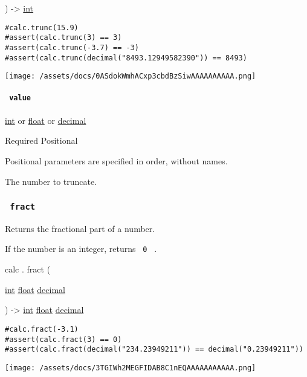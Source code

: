 ) -\textgreater{} \href{/docs/reference/foundations/int/}{int}

\begin{verbatim}
#calc.trunc(15.9)
#assert(calc.trunc(3) == 3)
#assert(calc.trunc(-3.7) == -3)
#assert(calc.trunc(decimal("8493.12949582390")) == 8493)
\end{verbatim}

\texttt{[image: /assets/docs/0ASdokWmhACxp3cbdBzSiwAAAAAAAAAA.png]}

\paragraph{\texorpdfstring{\texttt{\ value\ }}{ value }}\label{functions-trunc-value}

\href{/docs/reference/foundations/int/}{int} {or}
\href{/docs/reference/foundations/float/}{float} {or}
\href{/docs/reference/foundations/decimal/}{decimal}

{Required} {{ Positional }}

\label{functions-trunc-value-positional-tooltip}
Positional parameters are specified in order, without names.

The number to truncate.

\subsubsection{\texorpdfstring{\texttt{\ fract\ }}{ fract }}\label{functions-fract}

Returns the fractional part of a number.

If the number is an integer, returns \texttt{\ 0\ } .

calc { . } { fract } (

{ \href{/docs/reference/foundations/int/}{int}
\href{/docs/reference/foundations/float/}{float}
\href{/docs/reference/foundations/decimal/}{decimal} }

) -\textgreater{} \href{/docs/reference/foundations/int/}{int}
\href{/docs/reference/foundations/float/}{float}
\href{/docs/reference/foundations/decimal/}{decimal}

\begin{verbatim}
#calc.fract(-3.1)
#assert(calc.fract(3) == 0)
#assert(calc.fract(decimal("234.23949211")) == decimal("0.23949211"))
\end{verbatim}

\texttt{[image: /assets/docs/3TGIWh2MEGFIDAB8C1nEQAAAAAAAAAAA.png]}

